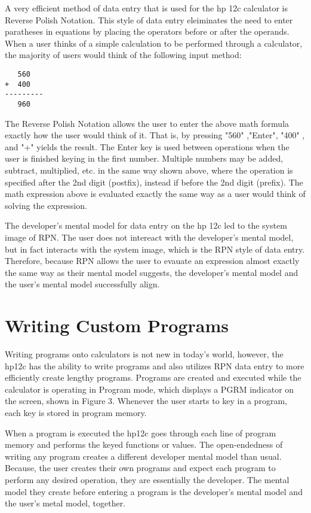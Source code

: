 \documentclass{article}
\begin{document}
A very efficient method of data entry that is used for the hp 12c calculator is Reverse Polish Notation. This style of data entry eleiminates the need to enter paratheses in equations by placing the operators before or after the operands. When a user thinks of a simple calculation to be performed through a calculator, the majority of users would think of the following input method:
\begin{verbatim}
   560
+  400
---------
   960
\end{verbatim}
The Reverse Polish Notation allows the user to enter the above math formula exactly how the user would think of it. That is, by pressing "560" ,"Enter",  "400" , and "+"  yields the result. The Enter key is used between operations when the user is finished keying in the first number. Multiple numbers may be added, subtract, multiplied, etc. in the same way shown above, where the operation is specified after the 2nd digit (postfix), instead if before the 2nd digit (prefix). The math expression above is evaluated exactly the same way as a user would think of solving the expression.

The developer's mental model for data entry on the hp 12c led to the system image of RPN. The user does not intereact with the developer's mental model, but in fact interacts with the system image, which is the RPN style of data entry. Therefore, because RPN allows the user to evauate an expression almost exactly the same way as their mental model suggests, the developer's mental model and the user's mental model successfully align.

\section{Writing Custom Programs}

Writing programs onto calculators is not new in today's world, however, the hp12c has the ability to write programs and also utilizes RPN data entry to more efficiently create lengthy programs. Programs are created and executed while the calculator is operating in Program mode, which displays a PGRM indicator on the screen, shown in Figure 3. Whenever the user starts to key in a program, each key is stored in program memory. 

When a program is executed the hp12c goes through each line of program memory and performs the keyed functions or values. The open-endedness of writing any program creates a different developer mental model than usual. Because, the user creates their own programs and expect each program to perform any desired operation, they are essentially the developer. The mental model they create before entering a program is the developer's mental model and the user's metal model, together. 
\end{document}

